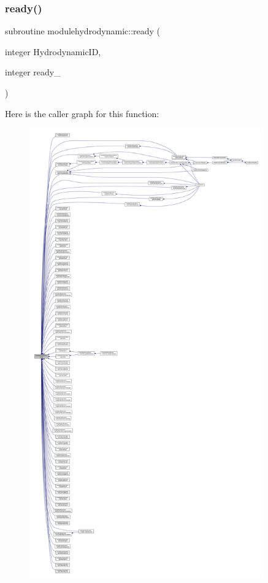\subsubsection{\texorpdfstring{ready()}{ready()}}
{\footnotesize\ttfamily subroutine modulehydrodynamic\+::ready (\begin{DoxyParamCaption}\item[{integer}]{Hydrodynamic\+ID,  }\item[{integer}]{ready\+\_\+ }\end{DoxyParamCaption})\hspace{0.3cm}{\ttfamily [private]}}

Here is the caller graph for this function\+:\nopagebreak
\begin{figure}[H]
\begin{center}
\leavevmode
\includegraphics[height=550pt]{namespacemodulehydrodynamic_a541821548a44af36e71f5eddedae890e_icgraph}
\end{center}
\end{figure}
\mbox{\label{namespacemodulehydrodynamic_a3590684b189672df14d8ed25dc6e6156}} 
